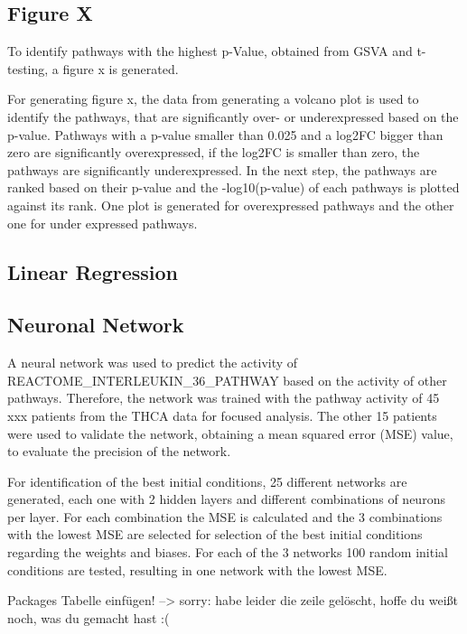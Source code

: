 \documentclass[
  parskip,
  oneside]{scrreprt}
\begin{document}
\hypertarget{figure-x}{%
\subsection{Figure X}\label{figure-x}}

To identify pathways with the highest p-Value, obtained from GSVA and
t-testing, a figure x is generated.

For generating figure x, the data from generating a volcano plot is used
to identify the pathways, that are significantly over- or underexpressed
based on the p-value. Pathways with a p-value smaller than 0.025 and a
log2FC bigger than zero are significantly overexpressed, if the log2FC
is smaller than zero, the pathways are significantly underexpressed. In
the next step, the pathways are ranked based on their p-value and the
-log10(p-value) of each pathways is plotted against its rank. One plot
is generated for overexpressed pathways and the other one for under
expressed pathways.

\hypertarget{linear-regression}{%
\subsection{Linear Regression}\label{linear-regression}}

\hypertarget{neuronal-network}{%
\subsection{Neuronal Network}\label{neuronal-network}}

A neural network was used to predict the activity of
REACTOME\_INTERLEUKIN\_36\_PATHWAY based on the activity of other
pathways. Therefore, the network was trained with the pathway activity
of 45 xxx patients from the THCA data for focused analysis. The other 15
patients were used to validate the network, obtaining a mean squared
error (MSE) value, to evaluate the precision of the network.

For identification of the best initial conditions, 25 different networks
are generated, each one with 2 hidden layers and different combinations
of neurons per layer. For each combination the MSE is calculated and the
3 combinations with the lowest MSE are selected for selection of the
best initial conditions regarding the weights and biases. For each of
the 3 networks 100 random initial conditions are tested, resulting in
one network with the lowest MSE.

Packages Tabelle einfügen! --\textgreater{} sorry: habe leider die zeile
gelöscht, hoffe du weißt noch, was du gemacht hast :(
\end{document}
